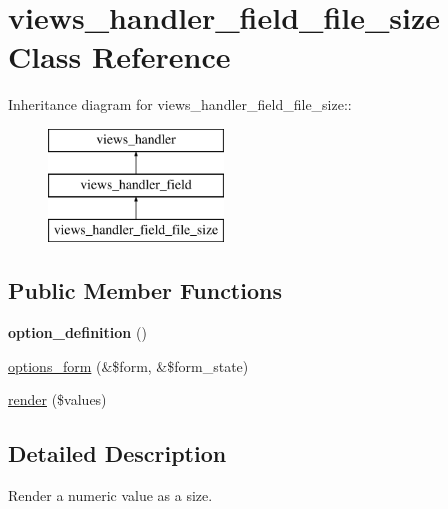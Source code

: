 \hypertarget{classviews__handler__field__file__size}{
\section{views\_\-handler\_\-field\_\-file\_\-size Class Reference}
\label{classviews__handler__field__file__size}
}
Inheritance diagram for views\_\-handler\_\-field\_\-file\_\-size::\begin{figure}[H]
\begin{center}
\leavevmode
\includegraphics[height=3cm]{classviews__handler__field__file__size}
\end{center}
\end{figure}
\subsection*{Public Member Functions}
\begin{DoxyCompactItemize}
\item 
\hypertarget{classviews__handler__field__file__size_ad89ade5ab0f9d3db4fe71df7588c0f34}{
{\bfseries option\_\-definition} ()}
\label{classviews__handler__field__file__size_ad89ade5ab0f9d3db4fe71df7588c0f34}

\item 
\hyperlink{classviews__handler__field__file__size_ab701c7b97e6688971ddfdcd7e9539262}{options\_\-form} (\&\$form, \&\$form\_\-state)
\item 
\hyperlink{classviews__handler__field__file__size_a9ceb28e958ee939634f1c91e28b8579c}{render} (\$values)
\end{DoxyCompactItemize}


\subsection{Detailed Description}
Render a numeric value as a size. 

